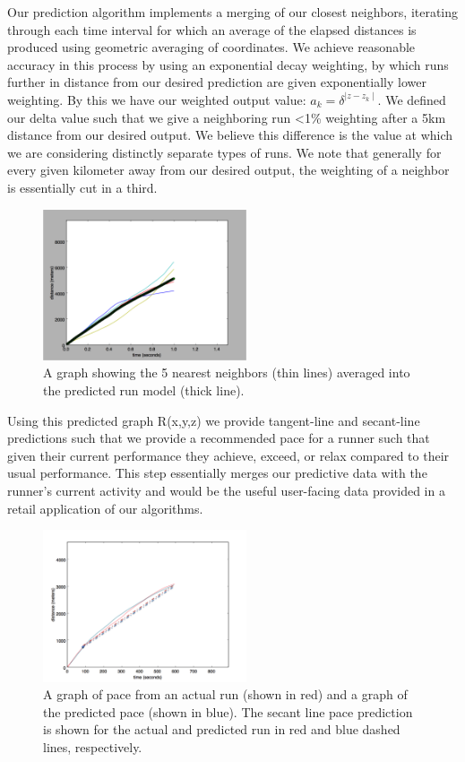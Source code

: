 \documentclass[twoside]{article}
\begin{document}
\begin{multicols}{2}
	Our prediction algorithm implements a merging of our closest neighbors, iterating through each time interval for which an average of the elapsed distances is produced using geometric averaging of coordinates.  We achieve reasonable accuracy in this process by using an exponential decay weighting, by which runs further in distance from our desired prediction are given exponentially lower weighting.  By this we have our weighted output value: $a_k = \delta^{\mid z-z_k\mid}$. We defined our delta value such that we give a neighboring run <1\% weighting after a 5km distance from our desired output.  We believe this difference is the value at which we are considering distinctly separate types of runs.  We note that generally for every given kilometer away from our desired output, the weighting of a neighbor is essentially cut in a third.\\
	
 \begin{figure}[H]
\begin{center}
\includegraphics[width=6cm]{combining.png}
\caption{A graph showing the 5 nearest neighbors (thin lines) averaged into the predicted run model (thick line). }
\end{center}
\end{figure}	
	
	Using this predicted graph R(x,y,z) we provide tangent-line and secant-line predictions such that we provide a recommended pace for a runner such that given their current performance they achieve, exceed, or relax compared to their usual performance.  This step essentially merges our predictive data with the runner's current activity and would be the useful user-facing data provided in a retail application of our algorithms.\\
	
\begin{figure}[H]
\begin{center}
\includegraphics[width=6cm]{overlap_run_secant.png}
\caption{A graph of pace from an actual run (shown in red) and a graph of the predicted pace (shown in blue).  The secant line pace prediction is shown for the actual and predicted run in red and blue dashed lines, respectively.}
\end{center}
\end{figure}	


\end{multicols}
\end{document}
